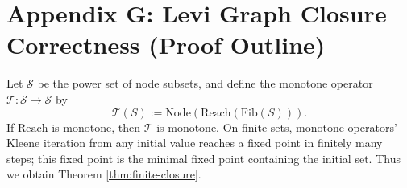\section{Appendix G: Levi Graph Closure Correctness (Proof Outline)}
\label{app:levi-closure-proof}

Let $\mathcal{S}$ be the power set of node subsets, and define the monotone operator $\mathcal{T}:\mathcal{S}\to\mathcal{S}$ by
\[
\mathcal{T}(S):=\mathrm{Node}(\mathrm{Reach}(\mathrm{Fib}(S))).
\]
If $\mathrm{Reach}$ is monotone, then $\mathcal{T}$ is monotone. On finite sets, monotone operators' Kleene iteration from any initial value reaches a fixed point in finitely many steps; this fixed point is the minimal fixed point containing the initial set. Thus we obtain Theorem \ref{thm:finite-closure}.
